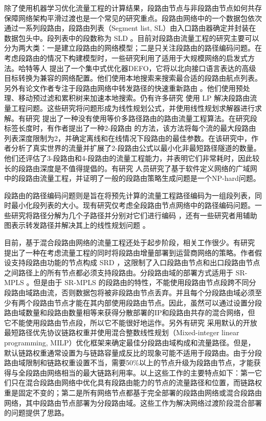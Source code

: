 除了使用机器学习优化流量工程的计算结果，段路由节点与非段路由节点如何共存保障网络架构平滑过渡也是一个常见的研究重点。段路由网络中的一个数据包依次通过一系列段路由，段路由列表（Segment list, SL）由入口路由器确定并封装在数据包头中。段列表中的段数称为 \gls*{SLD} 。目前对段路由流量工程的研究主要可以分为两大类：一是建立段路由的网络模型；二是只关注段路由的路径编码问题。在考虑段路由的情况下构建模型时，一些研究利用了适用于大规模网络的启发式方法。哈特等人 \cite{DEFO} 提出了一个集中式优化器DEFO，它将以北向接口语言表达的高级目标转换为兼容的网络配置。他们使用本地搜索来搜索最合适的段路由航点列表。另外有论文作者专注于段路由网络中转发路径的快速重新路由 \cite{SRFRR1, SRFRR2} 。他们使用预处理、移动预过滤和累积树来加速本地搜索。仍有许多研究 \cite{SRBANDWIDTH8} 使用 \gls*{LP} 解决段路由流量工程问题。这些研究将问题形成为线性规划公式，并使用线性规划求解器进行求解。有研究 \cite{SRBANDWIDTH7} 提出了一种没有使用等价多路径路由的路由流量工程算法。在研究段标签长度时，有作者提出了一种2-段路由 \cite{2SR} 的方法，该方法将每个流的最大段路由列表深度限制为2，并确定离线和在线情况下段路由的最佳参数。在该研究中，作者分析了真实世界的流量并扩展了2-段路由公式以最小化非最短路径隧道的数量。他们还评估了3-段路由和4-段路由的流量工程能力，并表明它们非常耗时，因此较长的段路由深度是不值得提倡的。有研究 \cite{SRBANDWIDTH10} 人员研究了基于软件定义网络的广域网中的段路由流量工程，并证明了一般的段路由策略生成问题是一个NP-hard问题。

段路由的路径编码问题则是旨在将预先计算的流量工程路径编码为一组段列表，同时最小化段列表的大小。现有研究仅考虑全段路由节点网络中的路径编码问题。一些研究将路径分解为几个子路径并分别对它们进行编码 \cite{SRXXXX1, SRXXXX2, SRXXXX3} ，还有一些研究者用辅助图表示转发路径并解决其上的线性规划问题 \cite{SRXXXX4, SRXXXX5} 。

目前，基于混合段路由网络的流量工程还处于起步阶段，相关工作很少。有研究 \cite{SRXXXX6} 提出了一种在考虑流量工程的同时将段路由增量部署到运营商网络的策略。作者假设支持段路由功能的节点构成 \gls*{SRD} ，这限制了入口段路由节点和出口段路由节点之间路径上的所有节点都必须支持段路由。分段路由域的部署方式适用于 \gls*{SR-MPLS} 。但是由于 \gls*{SR-MPLS} 的段路由的特性，不能使用段路由节点段跨不同分段路由域路由流，否则数据包将被非段路由节点丢弃。并且每个分段路由域必须至少有两个段路由节点才能在其内部使用段路由节点。因此，虽然可以通过设置分段路由域数量和段路由数量相等来获得分散部署的IP和段路由共存的混合网络，但它不能使用段路由节点段，所以它不能很好地运作。另外有研究 \cite{SRXXXX7} 采用默认的开放最短路径优先协议链路权重并使用混合整数线性规划（Mixed-integer linear programming, MILP）优化框架来确定最佳分段路由域构成和流量路径。但是，默认链路权重通常设置为与链路容量成反比的现象可能不适用于段路由。由于分段路由域限制和链路权重设置不当，需要50\%以上的节点升级为段路由节点，才能获得与全段路由网络相当的最大链路利用率。以上这些工作的主要特点如下：第一它们只在混合段路由网络中优化具有段路由能力的节点的流量路径和位置，而链路权重是固定不变的；第二是所有网络节点都基于完全部署的段路由网络或混合段路由网络，其中段路由节点部署为分段路由域。这些工作为解决网络过渡阶段混合部署的问题提供了思路。

